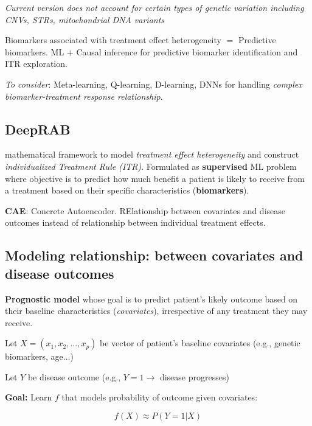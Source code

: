 \documentclass[../main.tex]{subfiles}
\begin{document}
\textit{Current version does not account for certain types of genetic variation including CNVs, STRs, mitochondrial DNA variants}

\hrulefill

 \cite{liu2025deep}

\hrulefill

Biomarkers associated with treatment effect heterogeneity $=$ Predictive biomarkers. 
ML $+$ Causal inference for predictive biomarker identification and ITR exploration. 

\textit{To consider}: Meta-learning, Q-learning, D-learning, DNNs for handling \textit{complex biomarker-treatment response relationship}.

\subsection*{DeepRAB} mathematical framework to model \textit{treatment effect heterogeneity} and construct \textit{individualized Treatment Rule (ITR)}. Formulated as \textbf{supervised} ML problem where objective is to predict how much benefit a patient is likely to receive from a treatment based on their specific characteristics (\textbf{biomarkers}).

\textbf{CAE}: Concrete Autoencoder.  RElationship between covariates and disease outcomes instead of relationship between individual treatment effects.

\subsection*{ Modeling relationship: between covariates and disease outcomes}

\textbf{Prognostic model} whose goal is to predict patient's likely outcome based on their baseline characteristics (\textit{covariates}), irrespective of any treatment they may receive.

Let $X = (x_1,x_2,...,x_p)$ be vector of patient's baseline covariates (e.g., genetic biomarkers, age...)

Let $Y$ be disease outcome (e.g., $Y = 1 \rightarrow$ disease progresses) 

\textbf{Goal:} Learn $f$ that models probability of outcome given covariates:

\begin{center}
    \[
    f(X) \approx P(Y=1|X)
    \]
\end{center}
\end{document}
